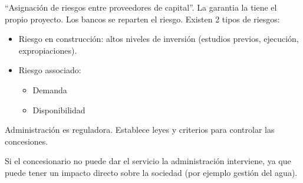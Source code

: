 \begin{mydef}
	``Asignación de riesgos entre proveedores de capital''. La garantia la tiene el propio proyecto. Los bancos se reparten el riesgo. Existen 2 tipos de riesgos:
	\begin{itemize}
		\item Riesgo en construcción: altos niveles de inversión (estudios previos, ejecución, expropiaciones).
		\item Riesgo associado:
		\begin{itemize}
			\item Demanda 
			\item Disponibilidad
		\end{itemize}
	\end{itemize}
\end{mydef}

\begin{mydef}
	Administración es reguladora. Establece leyes y criterios para controlar las concesiones.
\end{mydef}

\begin{mydef}
	Si el concesionario no puede dar el servicio la administración interviene, ya que puede tener un impacto directo sobre la sociedad (por ejemplo gestión del agua).
\end{mydef}

